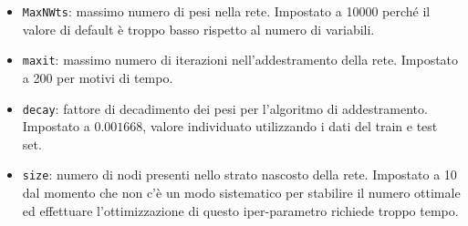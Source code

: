 \begin{itemize}
	\item \texttt{MaxNWts}: massimo numero di pesi nella rete. Impostato a 10000 perché il valore di default è troppo basso rispetto al numero di variabili.
	\item \texttt{maxit}: massimo numero di iterazioni nell'addestramento della rete. Impostato a 200 per motivi di tempo.
	\item \texttt{decay}: fattore di decadimento dei pesi per l'algoritmo di addestramento. Impostato a $0.001668$, valore individuato utilizzando i dati del train e test set.
	\item \texttt{size}: numero di nodi presenti nello strato nascosto della rete. Impostato a 10 dal momento che non c'è un modo sistematico per stabilire il numero ottimale ed effettuare l'ottimizzazione di questo iper-parametro richiede troppo tempo.
\end{itemize}

